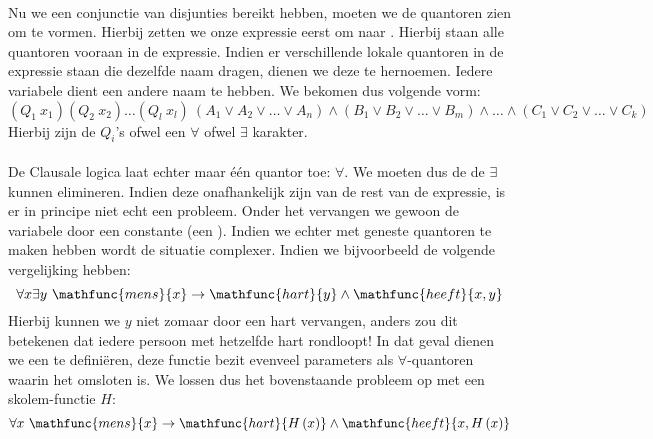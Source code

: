 \paragraph{}
Nu we een conjunctie van disjunties bereikt hebben, moeten we de quantoren zien om te vormen. Hierbij zetten we onze expressie eerst om naar . Hierbij staan alle quantoren vooraan in de expressie. Indien er verschillende lokale quantoren in de expressie staan die dezelfde naam dragen, dienen we deze te hernoemen. Iedere variabele dient een andere naam te hebben. We bekomen dus volgende vorm:
\begin{equation}
\left(Q_1\ x_1\right)\left(Q_2\ x_2\right)\ldots\left(Q_l\ x_l\right)\ \left(A_1\vee A_2\vee\ldots\vee A_n\right)\wedge\left(B_1\vee B_2\vee\ldots\vee B_m\right)\wedge\ldots\wedge\left(C_1\vee C_2\vee\ldots\vee C_k\right)
\end{equation}
Hierbij zijn de $Q_i$'s ofwel een $\forall$ ofwel $\exists$ karakter.
\paragraph{}De Clausale logica laat echter maar één quantor toe: $\forall$. We moeten dus de de $\exists$ kunnen elimineren. Indien deze onafhankelijk zijn van de rest van de expressie, is er in principe niet echt een probleem. Onder het  vervangen we gewoon de variabele door een constante (een ). Indien we echter met geneste quantoren te maken hebben wordt de situatie complexer. Indien we bijvoorbeeld de volgende vergelijking hebben:
\begin{equation}
\forall x\exists y\ \mathfunc{mens}{x}\rightarrow\mathfunc{hart}{y}\wedge\mathfunc{heeft}{x,y}
\end{equation}
Hierbij kunnen we $y$ niet zomaar door een hart vervangen, anders zou dit betekenen dat iedere persoon met hetzelfde hart rondloopt! In dat geval dienen we een  te definiëren, deze functie bezit evenveel parameters als $\forall$-quantoren waarin het omsloten is. We lossen dus het bovenstaande probleem op met een skolem-functie $H$:
\begin{equation}
\forall x\ \mathfunc{mens}{x}\rightarrow\mathfunc{hart}{H\left(x\right)}\wedge\mathfunc{heeft}{x,H\left(x\right)}
\end{equation}
